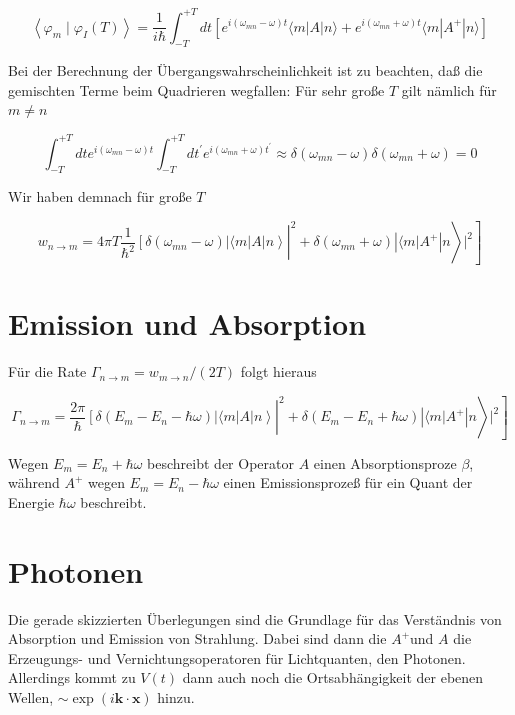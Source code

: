 \documentclass[10pt, letterpaper]{article}
\begin{document}
$$
\left\langle\varphi_{m} \mid \varphi_{I}(T)\right\rangle=\frac{1}{i \hbar} \int_{-T}^{+T} d t\left[e^{i\left(\omega_{m n}-\omega\right) t}\langle m| A|n\rangle+e^{i\left(\omega_{m n}+\omega\right) t}\langle m| A^{+}|n\rangle\right]
$$

Bei der Berechnung der Übergangswahrscheinlichkeit ist zu beachten, daß die gemischten Terme beim Quadrieren wegfallen: Für sehr große $T$ gilt nämlich für $m \neq n$

$$
\int_{-T}^{+T} d t e^{i\left(\omega_{m n}-\omega\right) t} \int_{-T}^{+T} d t^{\prime} e^{i\left(\omega_{m n}+\omega\right) t^{\prime}} \approx \delta\left(\omega_{m n}-\omega\right) \delta\left(\omega_{m n}+\omega\right)=0
$$

Wir haben demnach für große $T$

$$
\left.\left.w_{n \rightarrow m}=\left.4 \pi T \frac{1}{\hbar^{2}}\left[\delta\left(\omega_{m n}-\omega\right)|\langle m| A| n\right\rangle\right|^{2}+\delta\left(\omega_{m n}+\omega\right)\left|\langle m| A^{+}\right| n\right\rangle\left.\right|^{2}\right]
$$

\section*{Emission und Absorption}
Für die Rate $\Gamma_{n \rightarrow m}=w_{m \rightarrow n} /(2 T)$ folgt hieraus

$$
\left.\left.\Gamma_{n \rightarrow m}=\left.\frac{2 \pi}{\hbar}\left[\delta\left(E_{m}-E_{n}-\hbar \omega\right)|\langle m| A| n\right\rangle\right|^{2}+\delta\left(E_{m}-E_{n}+\hbar \omega\right)\left|\langle m| A^{+}\right| n\right\rangle\left.\right|^{2}\right]
$$

Wegen $E_{m}=E_{n}+\hbar \omega$ beschreibt der Operator $A$ einen Absorptionsproze $\beta$, während $A^{+}$ wegen $E_{m}=E_{n}-\hbar \omega$ einen Emissionsprozeß für ein Quant der Energie $\hbar \omega$ beschreibt.

\section*{Photonen}
Die gerade skizzierten Überlegungen sind die Grundlage für das Verständnis von Absorption und Emission von Strahlung. Dabei sind dann die $A^{+}$und $A$ die Erzeugungs- und Vernichtungsoperatoren für Lichtquanten, den Photonen. Allerdings kommt zu $V(t)$ dann auch noch die Ortsabhängigkeit der ebenen Wellen, $\sim \exp (i \mathbf{k} \cdot \mathbf{x})$ hinzu.
\end{document}

